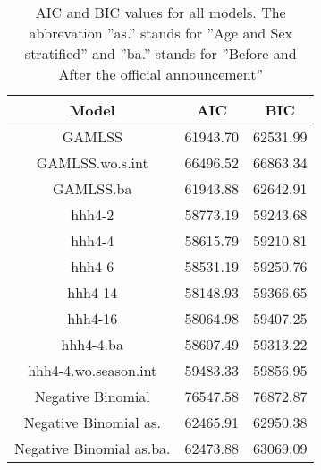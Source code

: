 \begin{table}[ht]
\centering
\begin{tabular}{ccc}
  \hline
Model & AIC & BIC \\ 
  \hline
GAMLSS & 61943.70 & 62531.99 \\ 
  GAMLSS.wo.s.int & 66496.52 & 66863.34 \\ 
  GAMLSS.ba & 61943.88 & 62642.91 \\ 
  hhh4-2 & 58773.19 & 59243.68 \\ 
  hhh4-4 & 58615.79 & 59210.81 \\ 
  hhh4-6 & 58531.19 & 59250.76 \\ 
  hhh4-14 & 58148.93 & 59366.65 \\ 
  hhh4-16 & 58064.98 & 59407.25 \\ 
  hhh4-4.ba & 58607.49 & 59313.22 \\ 
  hhh4-4.wo.season.int & 59483.33 & 59856.95 \\ 
  Negative Binomial  & 76547.58 & 76872.87 \\ 
  Negative Binomial as. & 62465.91 & 62950.38 \\ 
  Negative Binomial as.ba. & 62473.88 & 63069.09 \\ 
   \hline
\end{tabular}
\caption{AIC and BIC values for all models.
The abbrevation ''as.'' stands for ''Age and Sex stratified'' and ''ba.''
stands for ''Before and After the official announcement''} 
\label{TabelMods}
\end{table}
